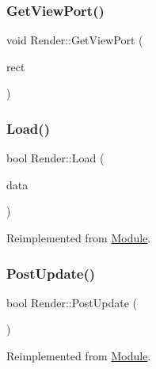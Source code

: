 \subsubsection{\texorpdfstring{GetViewPort()}{GetViewPort()}}
{\footnotesize\ttfamily void Render\+::\+Get\+View\+Port (\begin{DoxyParamCaption}\item[{S\+D\+L\+\_\+\+Rect \&}]{rect }\end{DoxyParamCaption})}

\mbox{\label{class_render_a47a72b2f12ff4a24eb4bf98d9b617434}} 
\subsubsection{\texorpdfstring{Load()}{Load()}}
{\footnotesize\ttfamily bool Render\+::\+Load (\begin{DoxyParamCaption}\item[{pugi\+::xml\+\_\+node \&}]{data }\end{DoxyParamCaption})\hspace{0.3cm}{\ttfamily [virtual]}}



Reimplemented from \mbox{\hyperlink{class_module_adf4ae9320f5f244c47b472348fb3c1f9}{Module}}.

\mbox{\label{class_render_a87fd5693f0ece06ba67ab57534b65dc6}} 
\subsubsection{\texorpdfstring{PostUpdate()}{PostUpdate()}}
{\footnotesize\ttfamily bool Render\+::\+Post\+Update (\begin{DoxyParamCaption}{ }\end{DoxyParamCaption})\hspace{0.3cm}{\ttfamily [virtual]}}



Reimplemented from \mbox{\hyperlink{class_module_afc355df351a4483850c3f512823ceebd}{Module}}.

\mbox{\label{class_render_a96d1311a9bc190d2a1dd669bb3c56ab4}} 
